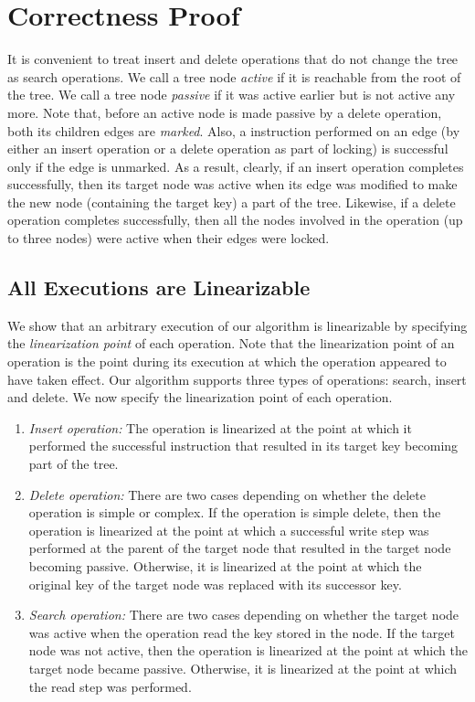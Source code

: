 \section{Correctness Proof}
It is convenient to treat insert and delete operations that do not change the tree as search operations. We call a tree node \emph{active} if it is reachable from the root of the 
tree. We call a tree node  \emph{passive} if it was active earlier but is not active any more. Note that, before an active node is made passive by a delete operation, both its 
children edges are \emph{marked}. Also, a \CAS{} instruction performed on an edge (by either an insert operation or a delete operation as part of locking) is successful only if the edge is unmarked. As a result, clearly, if an insert operation completes successfully, then  its target node was active when its edge was modified to make the new node (containing the target key) a part of the tree. Likewise, if a delete operation completes successfully, then all the nodes involved in the operation (up to three nodes) were active when their edges were locked.

\subsection*{All Executions are Linearizable}

We show that an arbitrary execution of our algorithm is linearizable by specifying the \emph{linearization point} of each operation. Note that the linearization point of an operation is the point during its execution at which the operation appeared to have taken effect. Our algorithm supports three types of operations: search, insert and delete. We now specify the linearization point of each operation.

\begin{enumerate}[leftmargin=*]
\item \emph{Insert operation:} The operation is linearized at the point at which it performed the successful \CAS{} instruction that resulted in its target key becoming part of the tree.					
\item \emph{Delete operation:} There are two cases depending on whether the delete operation is simple or complex. If the operation is simple delete, then the operation is linearized at the point at which a successful write step was performed at the parent of the target node that resulted in the target node becoming passive. Otherwise, it is linearized at the point at which the original key of the target node was replaced with its successor key.   
\item \emph{Search operation:} There are two cases depending on whether the target node was active when the operation read the key stored in the node. If the target node was not active, then the operation is linearized at the point at which the target node became passive. Otherwise, it is linearized at the point at which the read step was performed.
\end{enumerate}

